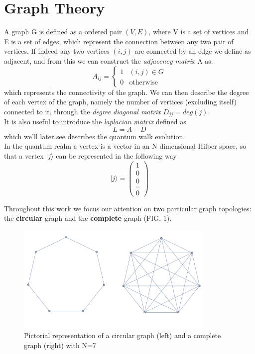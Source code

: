 \documentclass[11pt, twoside]{report}
\begin{document}
\section{Graph Theory}
A graph G is defined as a ordered pair $(V,E)$, where V is a set of vertices and E is a set of edges, which represent the connection between any two pair of vertices. If indeed any two vertices $(i,j)$ are connected by an edge we define as adjacent, and from this we can construct the \textit{adjacency matrix} A as:
\begin{equation}
A_{ij} = \begin{cases} 1 & (i,j)\in G \\ 0 & \mbox{otherwise} \end{cases}
\end{equation}
which represents the connectivity of the graph. We can then describe the degree of each vertex of the graph, namely the number of vertices (excluding itself) connected to it, through the \textit{degree diagonal matrix} $D_{jj} = deg(j)$.\\
It is also useful to introduce the \textit{laplacian matrix} defined as
\begin{equation}
  L = A-D
\end{equation}
which we'll later see describes the quantum walk evolution.\\
In the quantum realm a vertex is a vector in an N dimensional Hilber space, so that a vertex $|j\rangle$ can be represented in the following way
\begin{equation}
  |j\rangle = \begin{pmatrix} 1 \\ 0 \\ 0 \\ .. \\0 \end{pmatrix}
\end{equation}

Throughout this work we focus our attention on two particular graph topologies: the \textbf{circular} graph and the \textbf{complete} graph (FIG. 1).


\begin{figure}[ht]
\centering
\includegraphics[width=9.5cm]{./figures/graph.png}%
\caption{Pictorial representation of a circular graph (left) and a complete graph (right) with N=7}
\end{figure}
\end{document}
